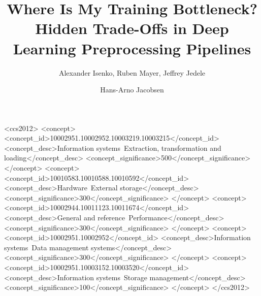 \documentclass[sigconf]{acmart}
\begin{document}
\fancyhead{}
\title[Hidden Trade-Offs in Deep Learning Preprocessing Pipelines]{Where Is My Training Bottleneck?\\ Hidden Trade-Offs in Deep Learning Preprocessing Pipelines}

\author{Alexander Isenko,\; Ruben Mayer,\; Jeffrey Jedele}

\author{Hans-Arno Jacobsen}

\renewcommand{\shortauthors}{Isenko, et al.}


\begin{CCSXML}
<ccs2012>
<concept>
<concept_id>10002951.10002952.10003219.10003215</concept_id>
<concept_desc>Information systems~Extraction, transformation and loading</concept_desc>
<concept_significance>500</concept_significance>
</concept>
<concept>
<concept_id>10010583.10010588.10010592</concept_id>
<concept_desc>Hardware~External storage</concept_desc>
<concept_significance>300</concept_significance>
</concept>
<concept>
<concept_id>10002944.10011123.10011674</concept_id>
<concept_desc>General and reference~Performance</concept_desc>
<concept_significance>300</concept_significance>
</concept>
<concept>
<concept_id>10002951.10002952</concept_id>
<concept_desc>Information systems~Data management systems</concept_desc>
<concept_significance>300</concept_significance>
</concept>
<concept>
<concept_id>10002951.10003152.10003520</concept_id>
<concept_desc>Information systems~Storage management</concept_desc>
<concept_significance>100</concept_significance>
</concept>
</ccs2012>
\end{CCSXML}
\end{document}
